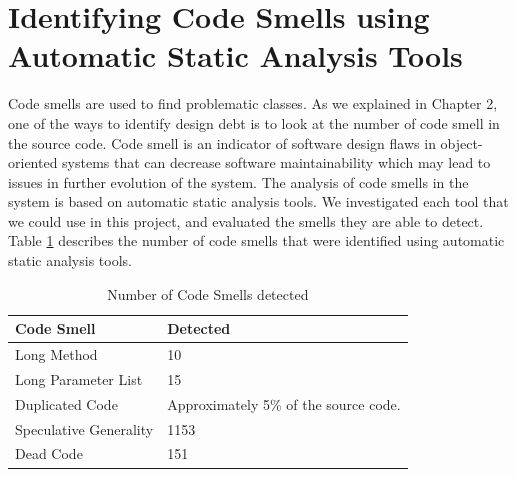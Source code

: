 







\section{Identifying Code Smells using Automatic Static Analysis Tools}
\label{sub:code_smell_detection}
Code smells are used to find problematic classes. As we explained in Chapter 2, one of the ways to identify design debt is to look at the number of code smell in the source code. Code smell is an indicator of software design flaws in object-oriented systems that can decrease software maintainability which may lead to issues in further evolution of the system\cite{olbrich2009evolution}. The analysis of code smells in the system is based on automatic static analysis tools. We investigated each tool that we could use in this project, and evaluated the smells they are able to detect. Table \ref{tab:identifiedCodeSmell} describes the number of code smells that were identified using automatic static analysis tools.

\begin{table}[]
\centering
\caption{Number of Code Smells detected}
\label{tab:identifiedCodeSmell}
\begin{tabular}{|l|p{3cm}|}
\hline
\textbf{Code Smell}                           & \textbf{Detected}    \\ \hline
Long Method                                   & 10          \\ \hline
Long Parameter List                           & 15          \\ \hline
Duplicated Code                               & Approximately 5\% of the source code.  \\ \hline
Speculative Generality                        & 1153      \\ \hline
Dead Code 									  & 151 \\ \hline
\end{tabular}
\end{table}

